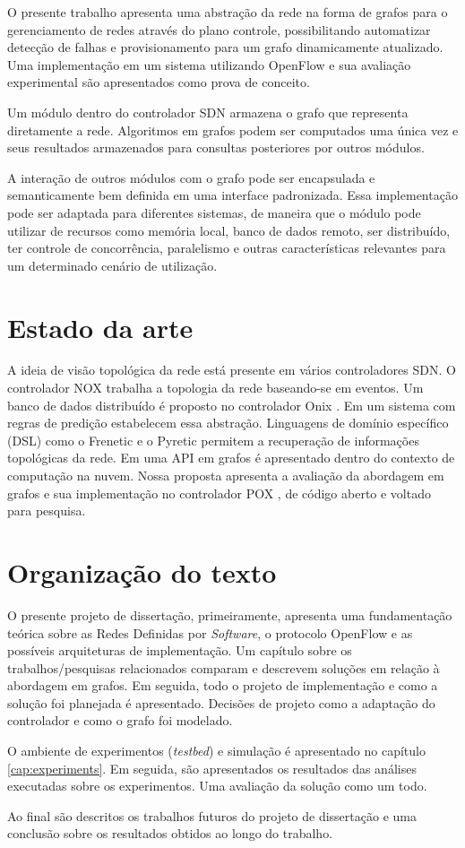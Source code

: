O presente trabalho apresenta uma abstração da rede na forma de grafos
para o gerenciamento de redes através do plano controle, possibilitando
automatizar detecção de falhas e provisionamento para um grafo dinamicamente
atualizado.
Uma implementação em um sistema utilizando OpenFlow \citep{nick2008openflow}
e sua avaliação experimental são apresentados como prova de conceito.

Um módulo dentro do controlador SDN armazena o grafo que representa diretamente
a rede.
Algoritmos em grafos podem ser computados uma única vez e seus resultados
armazenados para consultas posteriores por outros módulos.

A interação de outros módulos com o grafo pode ser encapsulada e
semanticamente bem definida em uma interface padronizada.
Essa implementação pode ser adaptada para diferentes sistemas, de maneira que
o módulo pode utilizar de recursos como memória local, banco de dados remoto,
ser distribuído, ter controle de concorrência, paralelismo e outras
características relevantes para um determinado cenário de utilização.

\section{Estado da arte}

A ideia de visão topológica da rede está presente em vários controladores SDN.
O controlador NOX \citep{gude2008nox} trabalha a topologia da rede baseando-se
em eventos.
Um banco de dados distribuído é proposto no controlador Onix
\citep{teemu2010onix}.
Em \citep{hinrichs2009pratical} um sistema com regras de predição
estabelecem essa abstração.
Linguagens de domínio específico (DSL) como o Frenetic
\citep{foster2011frenetic} e o Pyretic \citep{monsanto2013composing} permitem
a recuperação de informações topológicas da rede.
Em \citep{ramya2012dynamic} uma API em grafos é apresentado dentro do contexto
de computação na nuvem.
Nossa proposta apresenta a avaliação da abordagem em grafos e sua implementação
no controlador POX \citep{pox2015}, de código aberto e voltado para pesquisa.

\section{Organização do texto}

O presente projeto de dissertação, primeiramente, apresenta uma fundamentação
teórica sobre as Redes Definidas por \emph{Software}, o protocolo OpenFlow e
as possíveis arquiteturas de implementação.
Um capítulo sobre os trabalhos/pesquisas relacionados comparam e descrevem
soluções em relação à abordagem em grafos.
Em seguida, todo o projeto de implementação e como a solução foi planejada
é apresentado.
Decisões de projeto como a adaptação do controlador e como o grafo foi
modelado.

O ambiente de experimentos (\emph{testbed}) e simulação é apresentado no
capítulo \ref{cap:experiments}.
Em seguida, são apresentados os resultados das análises executadas sobre os
experimentos.
Uma avaliação da solução como um todo.

Ao final são descritos os trabalhos futuros do projeto de dissertação e uma
conclusão sobre os resultados obtidos ao longo do trabalho.
